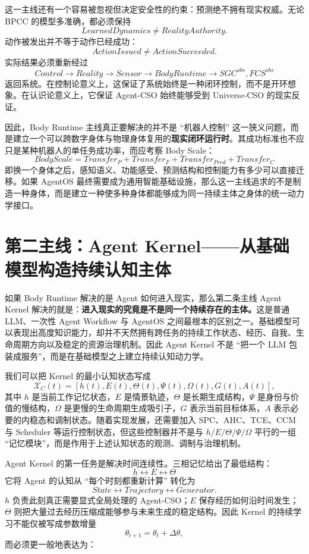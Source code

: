 这一主线还有一个容易被忽视但决定安全性的约束：预测绝不拥有现实权威。无论 BPCC 的模型多准确，都必须保持
\[
\boxed{
LearnedDynamics \neq RealityAuthority.
}
\]
动作被发出并不等于动作已经成功：
\[
ActionIssued \neq ActionSucceeded.
\]
实际结果必须重新经过
\[
Control
\rightarrow
Reality
\rightarrow
Sensor
\rightarrow
BodyRuntime
\rightarrow
SGC^{obs},FCS^{obs}
\]
返回系统。在控制论意义上，这保证了系统始终是一种闭环控制，而不是开环想象。在认识论意义上，它保证 Agent-CSO 始终能够受到 Universe-CSO 的现实反证。

因此，Body Runtime 主线真正要解决的并不是 ``机器人控制'' 这一狭义问题，而是建立一个可以跨数字身体与物理身体复用的\textbf{现实闭环运行时}。其成功标准也不应只是某种机器人的单任务成功率，而应考察 Body Scale：
\[
\boxed{
BodyScale
=
Transfer_P
+
Transfer_F
+
Transfer_{Pred}
+
Transfer_C
}
\]
即换一个身体之后，感知语义、功能感受、预测结构和控制能力有多少可以直接迁移。如果 AgentOS 最终需要成为通用智能基础设施，那么这一主线追求的不是制造一种身体，而是建立一种使多种身体都能够成为同一持续主体之身体的统一动力学接口。

\section{第二主线：Agent Kernel——从基础模型构造持续认知主体}
\label{sec:roadmap-agent-kernel}

如果 Body Runtime 解决的是 Agent 如何进入现实，那么第二条主线 Agent Kernel 解决的就是：\textbf{进入现实的究竟是不是同一个持续存在的主体。}这是普通 LLM、一次性 Agent Workflow 与 AgentOS 之间最根本的区别之一。基础模型可以表现出高度知识能力，却并不天然拥有跨任务的持续工作状态、经历、自我、生命周期方向以及稳定的资源治理机制。因此 Agent Kernel 不是 ``把一个 LLM 包装成服务''，而是在基础模型之上建立持续认知动力学。

我们可以把 Kernel 的最小认知状态写成
\[
\mathcal X_C(t)
=
\left[
h(t),
E(t),
\Theta(t),
\Psi(t),
\Omega(t),
G(t),
A(t)
\right],
\]
其中 $h$ 是当前工作记忆状态，$E$ 是情景轨迹，$\Theta$ 是长期生成结构，$\Psi$ 是身份与价值的慢结构，$\Omega$ 是更慢的生命周期生成吸引子，$G$ 表示当前目标体系，$A$ 表示必要的内稳态和调制状态。随着实现发展，还需要加入 SPC、AHC、TCE、CCM 与 Scheduler 等运行控制状态，但这些控制器并不是与 $h/E/\Theta/\Psi/\Omega$ 平行的一组 ``记忆模块''，而是作用于上述认知状态的观测、调制与治理机制。

Agent Kernel 的第一任务是解决时间连续性。三相记忆给出了最低结构：
\[
\boxed{
h \leftrightarrow E \leftrightarrow \Theta
}
\]
它将 Agent 的认知从 ``每个时刻都重新计算'' 转化为
\[
State
\leftrightarrow
Trajectory
\leftrightarrow
Generator.
\]
$h$ 负责此刻真正需要显式全局处理的 Agent-CSO；$E$ 保存经历如何沿时间发生；$\Theta$ 则把大量过去经历压缩成能够参与未来生成的稳定结构。因此 Kernel 的持续学习不能仅被写成参数增量
\[
\theta_{t+1}=\theta_t+\Delta\theta,
\]
而必须更一般地表达为：
\begin{statementbox}
\centering
{}
\end{statementbox}


